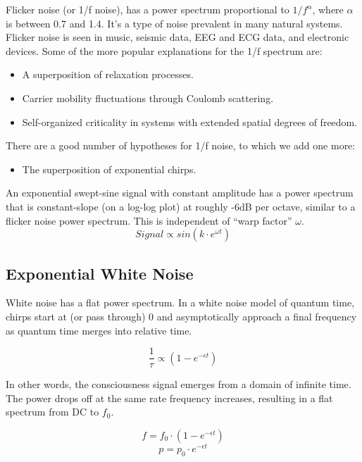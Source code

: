 Flicker noise (or 1/f noise), has a power spectrum proportional to
$1/f^{\alpha}$, where $\alpha$ is between 0.7 and 1.4.
It's a type of noise prevalent in many natural systems.
Flicker noise \cite{Milotti} is seen in music, seismic data, EEG and ECG data,
and electronic devices.
Some of the more popular explanations for the 1/f spectrum are:
\begin{itemize}
    \item A superposition of relaxation processes.
    \item Carrier mobility fluctuations through Coulomb scattering.
    \item Self-organized criticality in systems with extended spatial degrees of freedom. 
\end{itemize}
There are a good number of hypotheses for 1/f noise, to which we add one more:
\begin{itemize}
    \item The superposition of exponential chirps.
\end{itemize}
An exponential swept-sine signal with constant amplitude has a power spectrum
\cite{Novak} that is constant-slope (on a log-log plot) at roughly -6dB
per octave, similar to a flicker noise power spectrum.
This is independent of ``warp factor'' $\omega$.
\begin{equation} \label{eq:w}
Signal \propto sin(k \cdot e^{\omega t})
\end{equation}


\subsection{Exponential White Noise}

White noise has a flat power spectrum.
In a white noise model of quantum time,
chirps start at (or pass through) 0 and asymptotically approach
a final frequency as quantum time merges into relative time.

\begin{equation} \label{eq:white}
\frac{1}{\tau} \propto (1-e^{-\epsilon t})
\end{equation}

In other words, the consciousness signal emerges from a domain of infinite time.
The power drops off at the same rate frequency increases,
resulting in a flat spectrum from DC to $f_0$.

\begin{equation}
f = f_0 \cdot (1-e^{-\epsilon t})
\end{equation}
\begin{equation}
p = p_0 \cdot e^{-\epsilon t}
\end{equation}

